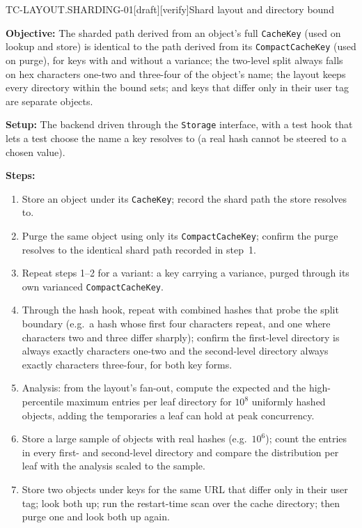 \begin{requirement}{TC-LAYOUT.SHARDING-01}[draft][verify]{Shard layout and directory bound}


  \textbf{Objective:} The sharded path derived from an object's full
  \texttt{CacheKey} (used on lookup and store) is identical to the path
  derived from its \texttt{CompactCacheKey} (used on purge), for keys with and
  without a variance; the two-level split always falls on hex characters
  one-two and three-four of the object's name; the layout keeps every
  directory within the bound  sets; and
  keys that differ only in their user tag are separate objects.

  \textbf{Setup:} The backend driven through the \texttt{Storage} interface,
  with a test hook that lets a test choose the name a key resolves to (a real
  hash cannot be steered to a chosen value).

  \textbf{Steps:}
  \begin{enumerate}
    \item Store an object under its \texttt{CacheKey}; record the shard
      path the store resolves to.
    \item Purge the same object using only its \texttt{CompactCacheKey};
      confirm the purge resolves to the identical shard path recorded in
      step~1.
    \item Repeat steps 1--2 for a variant: a key carrying a variance, purged
      through its own varianced \texttt{CompactCacheKey}.
    \item Through the hash hook, repeat with combined hashes that probe the
      split boundary (e.g.\ a hash whose first four characters repeat, and one
      where characters two and three differ sharply); confirm the first-level
      directory is always exactly characters one-two and the second-level
      directory always exactly characters three-four, for both key forms.
    \item Analysis: from the layout's fan-out, compute the expected and the
      high-percentile maximum entries per leaf directory for $10^8$ uniformly
      hashed objects, adding the temporaries a leaf can hold at peak
      concurrency.
    \item Store a large sample of objects with real hashes (e.g.\ $10^6$);
      count the entries in every first- and second-level directory and compare
      the distribution per leaf with the analysis scaled to the sample.
    \item Store two objects under keys for the same URL that differ only in
      their user tag; look both up; run the restart-time scan over the cache
      directory; then purge one and look both up again.
  \end{enumerate}


\end{requirement}
